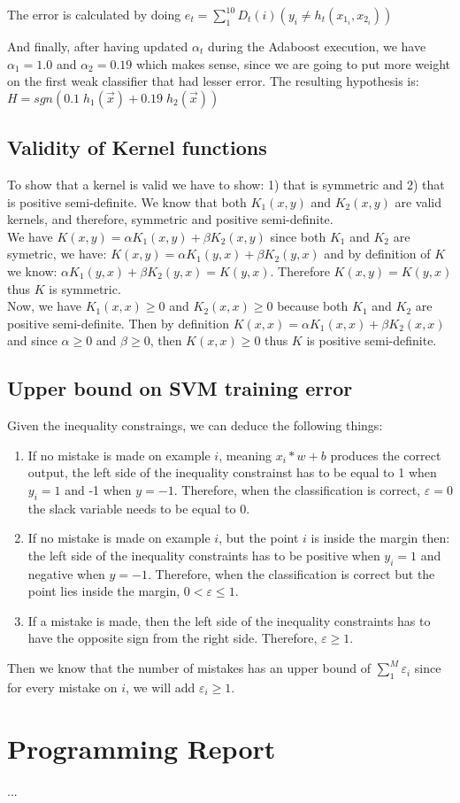 \documentclass[11pt]{article}
\begin{document}
The error is calculated by doing $e_t = \sum_{1}^{10} D_{t}(i) (y_{i} \neq h_{t}(x_{1_{i}}, x_{2_{i}}))$

And finally, after having updated $\alpha_t$ during the Adaboost execution, we have $\alpha_1 = 1.0$ and $\alpha_2 = 0.19$ which makes sense, since we are going to put more weight on the first weak classifier that had lesser error. The resulting hypothesis is: $H = sgn(0.1 \; h_{1}(\vec{x}) + 0.19 \; h_{2}(\vec{x}) )$

\subsection{Validity of Kernel functions}
To show that a kernel is valid we have to show: 1) that is symmetric and 2) that is positive semi-definite. We know that both $K_{1}(x,y)$ and $K_{2}(x,y)$ are valid kernels, and therefore, symmetric and positive semi-definite. \\

We have $K(x,y) = \alpha K_1(x,y) + \beta K_2(x,y)$ since both $K_{1}$ and $K_{2}$ are symetric, we have: $K(x,y) = \alpha K_1(y,x) + \beta K_2(y,x)$ and by definition of $K$ we know: $\alpha K_1(y,x) + \beta K_2(y,x) = K(y,x)$. Therefore  $K(x,y) = K(y,x)$ thus $K$ is symmetric. \\

Now, we have $K_{1}(x,x) \geq 0$ and $K_{2}(x,x) \geq 0$ because both $K_{1}$ and $K_{2}$ are positive semi-definite. Then by definition $K(x,x) = \alpha K_{1}(x,x) + \beta K_{2}(x,x)$ and since $\alpha \geq 0$ and $\beta \geq 0$, then $K(x,x) \geq 0$ thus $K$ is positive semi-definite. \\

\subsection{Upper bound on SVM training error}
 Given the inequality constraings, we can deduce the following things:
 \begin{enumerate}
 \item If no mistake is made on example $i$, meaning $x_{i} * w + b$ produces the correct output, the left side of the inequality constrainst has to be equal to 1 when $y_{i} = 1$ and -1 when $y = -1$. Therefore, when the classification is correct, $\varepsilon = 0$ the slack variable needs to be equal to 0.
 \item If no mistake is made on example $i$, but the point $i$ is inside the margin then: the left side of the inequality constraints has to be positive when $y_{i} = 1$ and negative when $y = -1$. Therefore, when the classification is correct but the point lies inside the margin,  $0 < \varepsilon \leq 1$.
 \item If a mistake is made, then the left side of the inequality constraints has to have the opposite sign from the right side. Therefore,  $\varepsilon \geq 1$. 
 \end{enumerate}
 
 Then we know that the number of mistakes has an upper bound of $\sum_{1}^{M} \varepsilon_{i}$ since for every mistake on $i$, we will add $\varepsilon_{i} \geq 1$. 

\section{Programming Report}
...

%
%
\end{document}
